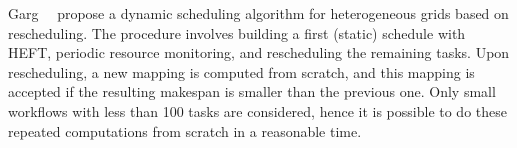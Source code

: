 \documentclass[conference]{IEEEtran}
\newcommand{\new}[1]{{#1}}
\begin{document}
    Garg~\etal~\cite{GARG2015256} propose a dynamic scheduling algorithm for heterogeneous grids based on rescheduling.
    The procedure involves building a first (static) schedule with HEFT, periodic resource monitoring, 
    and rescheduling the remaining tasks. 
    Upon rescheduling, a new mapping is computed from scratch, 
    and this mapping is accepted if the resulting makespan
    is smaller than the previous one.
    \new{Only small workflows with less than 100 tasks are considered, hence it is possible to do
    these repeated computations from scratch in a reasonable time. }
%

%
%
%
\end{document}
